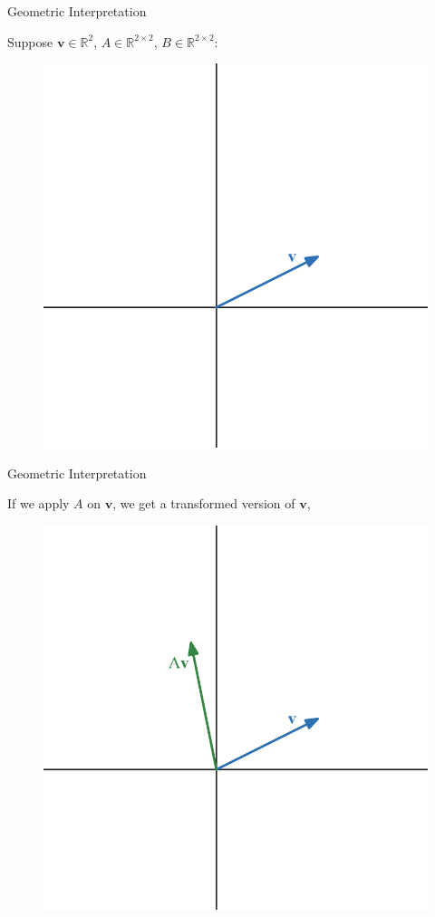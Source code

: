 \documentclass{beamer}
\newcommand{\R}{\mathbb{R}}
\begin{document}
\begin{frame}{Geometric Interpretation }

Suppose $\mathbf{v} \in \R^2$, $A \in \R^{2 \times 2}$, $B \in \R^{2 \times 2}$:

\begin{figure}
    \centering
    \includegraphics[width=0.5\linewidth]{matrix product/desmos-graph (1).png}
\end{figure}
\end{frame}


\begin{frame}{Geometric Interpretation }

If we apply $A$ on $\mathbf{v} $, we get a transformed version of $\mathbf{v} $,

\begin{figure}
    \centering
    \includegraphics[width=0.5\linewidth]{matrix product/desmos-graph (2).png}
\end{figure}



    
\end{frame}
\end{document}
